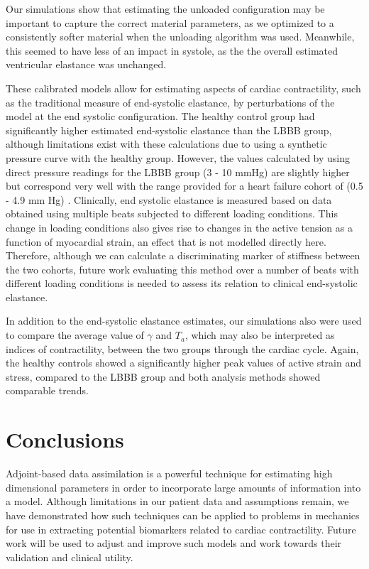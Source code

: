 Our simulations show that estimating the unloaded configuration may be important to capture the
correct material parameters, as we optimized to a consistently softer material when the unloading 
algorithm was used.  Meanwhile, this seemed to have less of an impact in systole, as the 
the overall estimated ventricular elastance was unchanged.

These calibrated models allow for estimating aspects of cardiac
contractility, such as the traditional measure of end-systolic
elastance, by perturbations of the model at the end systolic
configuration.  The healthy control group had significantly higher estimated
end-systolic elastance than the LBBB group, although limitations exist
with these calculations due to using a synthetic pressure curve with
the healthy group.  However, the values calculated by using direct
pressure readings for the LBBB group (3 - 10 mmHg) are slightly higher
but correspond very well with the range provided for a heart failure
cohort of (0.5 - 4.9 mm Hg) \cite{senzaki1996single}. Clinically, end systolic elastance is measured
based on data obtained using multiple beats
subjected to different loading conditions. This change in loading
conditions  also gives rise to changes in the active tension as a function of myocardial strain,
an effect that is not modelled directly here.  Therefore, although we can calculate a discriminating marker of
stiffness between the two cohorts, future work evaluating this method over a number of beats
with different loading conditions is needed to assess its relation to clinical end-systolic elastance.

In addition to the end-systolic elastance estimates, our simulations also were used to
compare the average value of $\gamma$ and $T_a$, which may also be
interpreted as indices of contractility, between the two groups
through the cardiac cycle. Again, the healthy controls showed a
significantly higher peak values of active strain and stress, compared
to the LBBB group and both  analysis methods showed comparable trends. 


\section{Conclusions}

Adjoint-based data assimilation is a powerful technique for
estimating high dimensional parameters in order to incorporate large
amounts of information into a model. Although limitations in our
patient data and assumptions remain, we have demonstrated how such
techniques can be applied to problems in mechanics for use in
extracting potential biomarkers related to cardiac
contractility. Future work will be used to adjust and improve such
models and work towards their validation and clinical utility.


